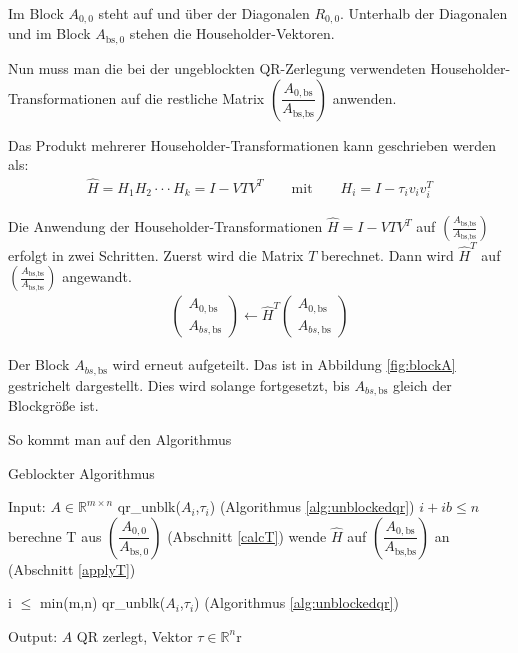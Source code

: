 Im Block $A_{0, 0}$ steht auf und über der Diagonalen $R_{0,0}$. Unterhalb der Diagonalen und im Block $A_{\text{bs}, 0}$ stehen die Householder-Vektoren.

Nun muss man die bei der ungeblockten QR-Zerlegung verwendeten Householder-Transformationen auf die restliche Matrix $ \left(\dfrac{A_{0, \text{bs}}}{A_{\text{bs}, \text{bs}}} \right)$ anwenden.

Das Produkt mehrerer Householder-Transformationen kann geschrieben werden als:
\begin{align*}
\hat{H} = H_1H_2 \cdot \cdot \cdot H_k = I - V T  V^T \qquad \text{mit}\qquad H_i = I - \tau_i v_iv_i^T
\end{align*}  \cite{Joffrain:2006:AHT:1141885.1141886}

Die Anwendung der Householder-Transformationen $\hat{H} = I - V T  V^T$ auf $\left(\frac{A_{\text{bs}, \text{bs}}}{A_{\text{bs}, \text{bs}}} \right)$ erfolgt in zwei Schritten. Zuerst wird  die Matrix $T$ berechnet. Dann wird $\hat{H}^T$  auf $\left(\frac{A_{\text{bs}, \text{bs}}}{A_{\text{bs}, \text{bs}}} \right)$ angewandt.
\begin{align}
	\left(\begin{array}{l} 
	A_{0, \text{bs}} \\ \hline
	A_{bs, \text{bs}}
	\end{array}\right)
	\leftarrow
	\hat{H}^T \left(\begin{array}{l} 
	A_{0, \text{bs}} \\ \hline
	A_{bs, \text{bs}}
	\end{array}\right)
\end{align}

Der Block $A_{bs, \text{bs}}$ wird erneut aufgeteilt. Das ist in Abbildung \ref{fig:blockA} gestrichelt dargestellt.
Dies wird solange fortgesetzt, bis $A_{bs, \text{bs}}$ gleich der Blockgröße ist.

So kommt man auf den Algorithmus 

\begin{algorithm}[H]
	\caption{Geblockter Algorithmus}
	\label{alg:blockedqr}
	\begin{algorithmic}[1]
		\State Input: $A \in \mathbb{R}^{m \times n}$
			\State qr\_unblk($A_i$,$\tau_i$) (Algorithmus \ref{alg:unblockedqr})
			\If $i + ib \le n$
				\State berechne T aus $\left(\dfrac{A_{0, 0}}{A_{\text{bs}, 0}} \right) $ (Abschnitt \ref{calcT})
				\State wende $\hat{H}$ auf $\left(\dfrac{A_{0, \text{bs}}}{A_{\text{bs}, \text{bs}}} \right) $ an (Abschnitt \ref{applyT})
			\EndIf 
		\EndFor	
		
		\If i $\le$ min(m,n)
			\State qr\_unblk($A_i$,$\tau_i$) (Algorithmus \ref{alg:unblockedqr})
		\EndIf
		 
		\State Output: $A$ QR zerlegt, Vektor $\tau \in \mathbb{R}^n$r
	\end{algorithmic}
\end{algorithm}


